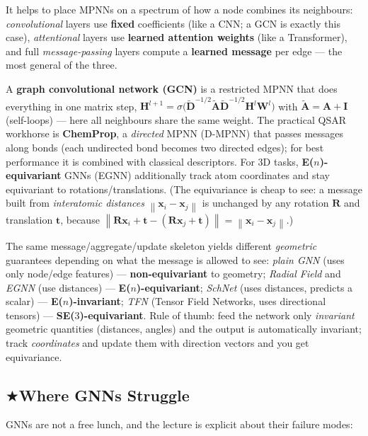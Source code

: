 \documentclass[11pt, oneside]{book}
\makeatletter
\newcommand{\starglyph}{\textcolor{stargold}{\ensuremath{\bigstar}}}
\newcommand{\starsec}[1]{%
  \texorpdfstring{\starglyph\hspace{0.4em}\textcolor{star@frame}{#1}}{#1}}
\newcommand{\norm}[1]{\left\lVert #1 \right\rVert}
\newcommand{\xvec}{\mathbf{x}}
\makeatother
\begin{document}
It helps to place MPNNs on a spectrum of how a node combines its neighbours:
\emph{convolutional} layers use \textbf{fixed} coefficients (like a CNN; a GCN is
exactly this case), \emph{attentional} layers use \textbf{learned attention
weights} (like a Transformer), and full \emph{message-passing} layers compute a
\textbf{learned message} per edge --- the most general of the three.

A \textbf{graph convolutional network (GCN)} is a restricted MPNN that does
everything in one matrix step,
$\bm{H}^{l+1} = \sigma\!\big(\tilde{\bm{D}}^{-1/2}\tilde{\bm{A}}\tilde{\bm{D}}^{-1/2}\bm{H}^l\bm{W}^l\big)$
with $\tilde{\bm{A}}=\bm{A}+\bm{I}$ (self-loops) --- here all neighbours share the
same weight. The practical QSAR workhorse is \textbf{ChemProp}, a \emph{directed}
MPNN (D-MPNN) that passes messages along bonds (each undirected bond becomes two
directed edges); for best performance it is combined with classical descriptors.
For 3D tasks, \textbf{E($n$)-equivariant} GNNs (EGNN) additionally track atom
coordinates and stay equivariant to rotations/translations. (The equivariance is
cheap to see: a message built from \emph{interatomic distances}
$\norm{\xvec_i-\xvec_j}$ is unchanged by any rotation $\bm{R}$ and translation
$\bm{t}$, because $\norm{\bm{R}\xvec_i+\bm{t}-(\bm{R}\xvec_j+\bm{t})}=\norm{\xvec_i-\xvec_j}$.)

\begin{notebox}[title={A zoo of 3D message-passing layers --- and their symmetry group}]
The same message/aggregate/update skeleton yields different \emph{geometric}
guarantees depending on what the message is allowed to see:
\emph{plain GNN} (uses only node/edge features) --- \textbf{non-equivariant} to
geometry; \emph{Radial Field} and \emph{EGNN} (use distances) ---
\textbf{E($n$)-equivariant}; \emph{SchNet} (uses distances, predicts a scalar) ---
\textbf{E($n$)-invariant}; \emph{TFN} (Tensor Field Networks, uses directional
tensors) --- \textbf{SE($3$)-equivariant}. Rule of thumb: feed the network only
\emph{invariant} geometric quantities (distances, angles) and the output is
automatically invariant; track \emph{coordinates} and update them with
direction vectors and you get equivariance.
\end{notebox}

\subsection{\starsec{Where GNNs Struggle}}

GNNs are not a free lunch, and the lecture is explicit about their failure modes:
\end{document}
